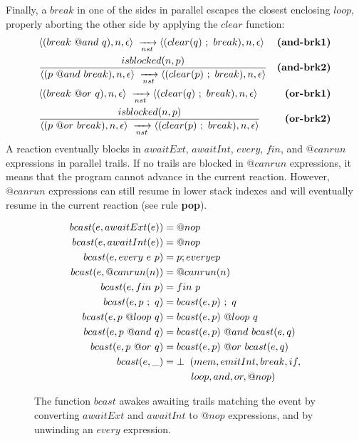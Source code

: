 Finally, a $break$ in one of the sides in parallel escapes the closest 
enclosing $loop$, properly aborting the other side by applying the $clear$ 
function:
%
{ \setlength{\jot}{20pt}
\begin{eqnarray*}
& \LL (break~@and~q), n, \epsilon \RR \NST \LL (clear(q)~;~break),n,\epsilon \RR
    & \textbf{(and-brk1)}   \\
& \frac
    { \DS isblocked(n,p) }
    { \DS \LL (p~@and~break), n, \epsilon \RR \NST \LL (clear(p)~;~break),n,\epsilon \RR }
    & \textbf{(and-brk2)}   \\
& \LL (break~@or~q),n,\epsilon \RR \NST \LL (clear(q)~;~break),n,\epsilon \RR
    & \textbf{(or-brk1)}   \\
& \frac
    { \DS isblocked(n,p) }
    { \DS \LL (p~@or~break),n,\epsilon \RR \NST \LL (clear(p)~;~break),n,\epsilon \RR }
    & \textbf{(or-brk2)}   %
\end{eqnarray*}
}
%
A reaction eventually blocks in $awaitExt$, $awaitInt$, $every$, $fin$, and
$@canrun$ expressions in parallel trails.
%
If no trails are blocked in $@canrun$ expressions, it means that the program 
cannot advance in the current reaction.
%
However, $@canrun$ expressions can still resume in lower stack indexes and will
eventually resume in the current reaction (see rule \textbf{pop}).

\begin{figure}
{\small
\begin{align*}
  bcast(e, awaitExt(e)) &= @nop                         \\
  bcast(e, awaitInt(e)) &= @nop                         \\
  bcast(e, every~e~p)   &= p; every e p                 \\
  bcast(e, @canrun(n))  &= @canrun(n)                   \\
  bcast(e, fin~p)       &= fin~p                        \\
  bcast(e, p~;~q)       &= bcast(e,p)~;~q               \\
  bcast(e, p~@loop~q)   &= bcast(e,p)~@loop~q           \\
  bcast(e, p~@and~q)    &= bcast(e,p)~@and~bcast(e,q)   \\
  bcast(e, p~@or~q)     &= bcast(e,p)~@or~bcast(e,q)    \\
  bcast(e, \_)          &= \bot \2 (mem,emitInt,break,if,  \\
                                 & \5\5 loop,and,or,@nop) %
\end{align*}
}
\caption{
The function $bcast$ awakes awaiting trails matching the event by converting
$awaitExt$ and $awaitInt$ to $@nop$ expressions, and by unwinding an $every$
expression.
\label{fig.bcast}
}
\end{figure}

